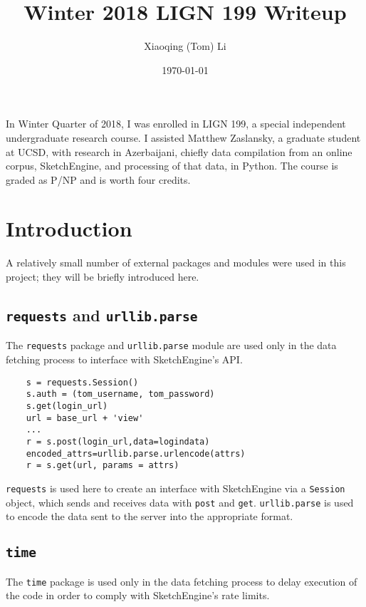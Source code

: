 \documentclass{article}      %
\title{Winter 2018 LIGN 199 Writeup}  %
\author{Xiaoqing (Tom) Li}      %
\date\today      %
\begin{document}
	
	\maketitle                   %
	
	In Winter Quarter of 2018, I was enrolled in LIGN 199, a special independent undergraduate research course. I assisted Matthew Zaslansky, a graduate student at UCSD, with research in Azerbaijani, chiefly data compilation from an online corpus, SketchEngine, and processing of that data, in Python. The course is graded as P/NP and is worth four credits.
	
	\section{Introduction}
	
	A relatively small number of external packages and modules were used in this project; they will be briefly introduced here.
	
	\subsection{\texttt{requests} and \texttt{urllib.parse}}
	
	The \texttt{requests} package and \texttt{urllib.parse} module are used only in the data fetching process to interface with SketchEngine's API.
	
	\begin{verbatim}
	s = requests.Session()
	s.auth = (tom_username, tom_password)
	s.get(login_url)
	url = base_url + 'view'
	...
	r = s.post(login_url,data=logindata)
	encoded_attrs=urllib.parse.urlencode(attrs)
	r = s.get(url, params = attrs)
	\end{verbatim}
	
	\texttt{requests} is used here to create an interface with SketchEngine via a \texttt{Session} object, which sends and receives data with \texttt{post} and \texttt{get}. \texttt{urllib.parse} is used to encode the data sent to the server into the appropriate format.
	
	\subsection{\texttt{time}}
	
	The \texttt{time} package is used only in the data fetching process to delay execution of the code in order to comply with SketchEngine's rate limits.
	
\end{document}

